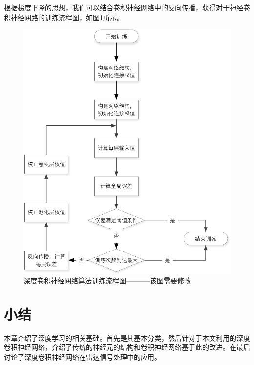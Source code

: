 根据梯度下降的思想，我们可以结合卷积神经网络中的反向传播，获得对于神经卷积神经网路的训练流程图，如图\ref{fig:cnn_train}所示。
\begin{figure}[hbt]
	\centering
	\includegraphics[width=\textwidth]{figures/networks/cnn_train}
	\caption{深度卷积神经网络算法训练流程图-----------该图需要修改}
	\label{fig:cnn_train}
\end{figure}
\section{小结}
本章介绍了深度学习的相关基础。首先是其基本分类，然后针对于本文利用的深度卷积神经网络，介绍了传统的神经元的结构和卷积神经网络基于此的改进。在最后讨论了深度卷积神经网络在雷达信号处理中的应用。
